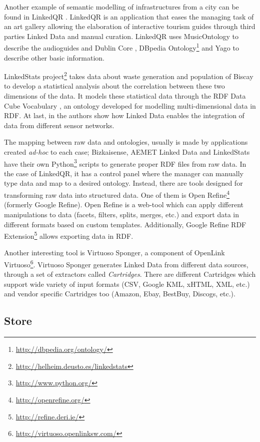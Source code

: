 Another example of semantic modelling of infrastructures from a city can be found in LinkedQR \cite{emaldi2012linkedqr}. LinkedQR is an application that eases the managing task of an art gallery allowing the elaboration of interactive tourism guides through third parties Linked Data and manual curation. LinkedQR uses MusicOntology \cite{raimond2007music} to describe the audioguides and Dublin Core \cite{weibel1998dublin}, DBpedia Ontology\footnote{\url{http://dbpedia.org/ontology/}} and Yago \cite{suchanek2007yago} to describe other basic information.

LinkedStats project\footnote{\url{http://helheim.deusto.es/linkedstats}} takes data about waste generation and population of Biscay to develop a statistical analysis about the correlation between these two dimensions of the data. It models these statistical data through the RDF Data Cube Vocabulary \cite{_rdf_2013}, an ontology developed for modelling multi-dimensional data in RDF. At last, in \cite{stasch2011aggregating} the authors show how Linked Data enables the integration of data from different sensor networks.

The mapping between raw data and ontologies, usually is made by applications created \textit{ad-hoc} to each case; Bizkaisense, AEMET Linked Data and LinkedStats have their own Python\footnote{\url{http://www.python.org/}} scripts to generate proper RDF files from raw data. In the case of LinkedQR, it has a control panel where the manager can manually type data and map to a desired ontology. Instead, there are tools designed for transforming raw data into structured data. One of them is Open Refine\footnote{\url{http://openrefine.org/}} (formerly Google Refine). Open Refine is a web-tool which can apply different manipulations to data (facets, filters, splits, merges, etc.) and export data in different formats based on custom templates. Additionally, Google Refine RDF Extension\footnote{\url{http://refine.deri.ie/}} allows exporting data in RDF.

Another interesting tool is Virtuoso Sponger, a component of OpenLink Virtuoso\footnote{\url{http://virtuoso.openlinksw.com/}}. Virtuoso Sponger generates Linked Data from different data sources, through a set of extractors called \textit{Cartridges}. There are different Cartridges which support wide variety of input formats (CSV, Google KML, xHTML, XML, etc.) and vendor specific Cartridges too (Amazon, Ebay, BestBuy, Discogs, etc.).

\subsection{Store}\label{subsec:store}

